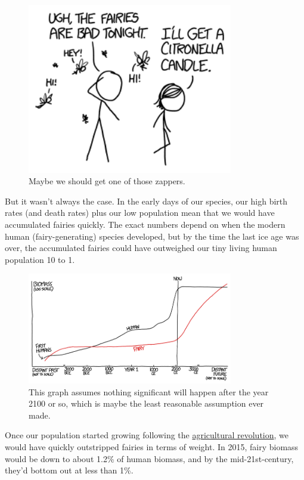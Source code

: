 {\begin{figure}[!htbp]
\centering
\includegraphics[scale=0.5, max width=0.8\textwidth]{imgs/a/123/bad.png}
\caption{Maybe we should get one of those zappers.}
\end{figure}

{But it wasn't always the case. In the early days of our species, our high birth rates (and death rates) plus our low population mean that we would have accumulated fairies quickly. The exact numbers depend on when the modern human (fairy-generating) species developed, but by the time the last ice age was over, the accumulated fairies could have outweighed our tiny living human population 10 to 1.}

\begin{figure}[!htbp]
\centering
\includegraphics[scale=0.5, max width=0.8\textwidth]{imgs/a/123/graph.png}
\caption{This graph assumes nothing significant will happen after the year 2100 or so, which is maybe the least reasonable assumption ever made.}
\end{figure}

{Once our population started growing following the \href{http://en.wikipedia.org/wiki/Neolithic\_Revolution}{agricultural revolution}, we would have quickly outstripped fairies in terms of weight. In 2015, fairy biomass would be down to about 1.2\% of human biomass, and by the mid-21st-century, they'd bottom out at less than 1\%.}

}
